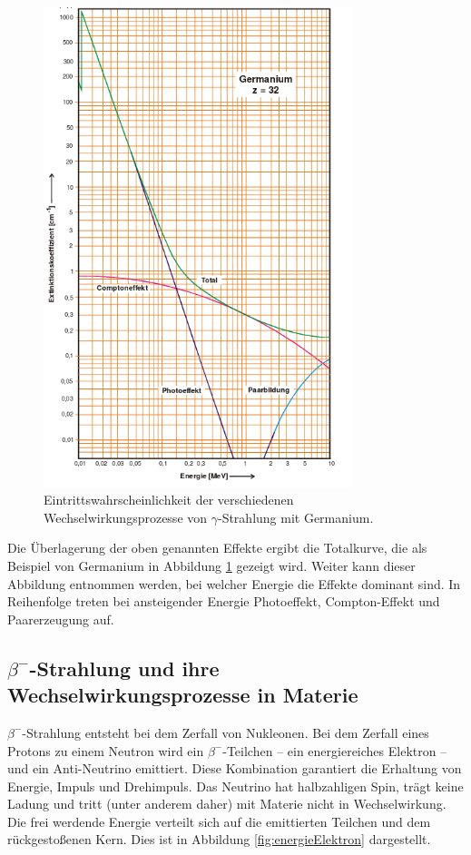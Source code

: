 \begin{figure}[p]
	\centering
	\includegraphics[width=0.8\textwidth]{Bilder/germanium.png}
	\caption{Eintrittswahrscheinlichkeit der verschiedenen Wechselwirkungsprozesse von \texorpdfstring{$\gamma$}{Gamma}-Strahlung mit Germanium.\cite{skript}}
	\label{fig:Germanium}
\end{figure}
Die Überlagerung der oben genannten Effekte ergibt die Totalkurve, die als Beispiel von Germanium in Abbildung \ref{fig:Germanium} gezeigt wird.
Weiter kann dieser Abbildung entnommen werden, bei welcher Energie die Effekte dominant sind.
In Reihenfolge treten bei ansteigender Energie Photoeffekt, Compton-Effekt und Paarerzeugung auf.


\subsection{\texorpdfstring{$\beta^-$}{Beta}-Strahlung und ihre Wechselwirkungsprozesse in Materie}
\label{sec:beta}

$\beta^-$-Strahlung entsteht bei dem Zerfall von Nukleonen.
Bei dem Zerfall eines Protons zu einem Neutron wird ein $\beta^-$-Teilchen -- ein energiereiches Elektron -- und ein Anti-Neutrino emittiert.
Diese Kombination garantiert die Erhaltung von Energie, Impuls und Drehimpuls.
Das Neutrino hat halbzahligen Spin, trägt keine Ladung und tritt (unter anderem daher) mit Materie nicht in Wechselwirkung.
Die frei werdende Energie verteilt sich auf die emittierten Teilchen und dem rückgestoßenen Kern.
Dies ist in Abbildung \ref{fig:energieElektron} dargestellt.

